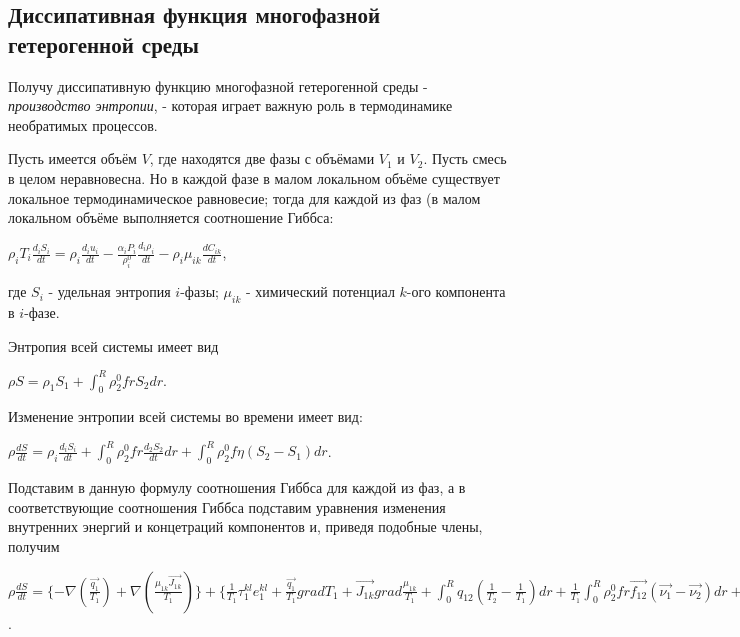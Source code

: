 \documentclass[12pt, a4paper]{report}
\begin{document}
	\subsection*{Диссипативная функция многофазной гетерогенной среды}
	\large
	Получу диссипативную функцию многофазной гетерогенной среды - \textit{производство энтропии}, - которая играет важную роль в термодинамике необратимых процессов. \par
	Пусть имеется объём $V$, где находятся две фазы с объёмами $V_{1}$ и $V_{2}$. Пусть смесь в целом неравновесна. Но в каждой фазе в малом локальном объёме существует локальное термодинамическое равновесие; тогда для каждой из фаз (в малом локальном объёме выполняется соотношение Гиббса:
	\begin{center}
		$\rho_{i} T_{i} \frac{d_{i} S_{i}}{dt} = \rho_{i} \frac{d_{i} u_{i}}{dt} - \frac{\alpha_{i} P_{i}}{\rho_{i}^{0}}\frac{d_{i} \rho_{i}}{dt} - \rho_{i} \mu_{ik} \frac{d C_{ik}}{dt}$,
	\end{center}
	где $S_{i}$ - удельная энтропия $i$-фазы; $\mu_{ik}$ - химический потенциал $k$-ого компонента в $i$-фазе. \par
	Энтропия всей системы имеет вид
	\begin{center}
		$\rho S = \rho_{1}S_{1} + \int_{0}^{R} \rho_{2}^{0} f r S_{2} dr$.
	\end{center}
	\par
	Изменение энтропии всей системы во времени имеет вид:
	\begin{center}
		$\rho \frac{dS}{dt} = \rho_{i} \frac{d_{i} S_{i}}{dt} + \int_{0}^{R} \rho_{2}^{0} f r \frac{d_{2} S_{2}}{dt} dr + \int_{0}^{R} \rho_{2}^{0} f \eta (S_{2} - S_{1}) dr$.
	\end{center}
	\par
	Подставим в данную формулу соотношения Гиббса для каждой из фаз, а в соответствующие соотношения Гиббса подставим уравнения изменения внутренних энергий и концетраций компонентов и, приведя подобные члены, получим
	\begin{center}
		$\rho \frac{dS}{dt} = \{-\nabla(\frac{\vec{q_{1}}}{T_{1}}) + \nabla(\frac{\mu_{1k} \vec{J_{1k}}}{T_{1}})\} + \{\frac{1}{T_{1}} \tau_{1}^{kl} e_{1}^{kl} + \frac{\vec{q_{1}}}{T_{1}} gradT_{1} + \vec{J_{1k}} grad \frac{\mu_{1k}}{T_{1}} + \int_{0}^{R} q_{12} (\frac{1}{T_{2}} - \frac{1}{T_{1}}) dr + \frac{1}{T_{1}} \int_{0}^{R} \rho_{2}^{0} f r \vec{f_{12}} (\vec{\nu_{1}} - \vec{\nu_{2}}) dr + \int_{0}^{R} \rho_{2}^{0} f \eta [(\frac{\mu_{1k}}{T_{2}} - \frac{\mu_{2k}}{T_{2}}) + i_{1}(\frac{1}{T_{2}} - \frac{1}{T_{1}})] dr\}$.
	\end{center}
\end{document}

